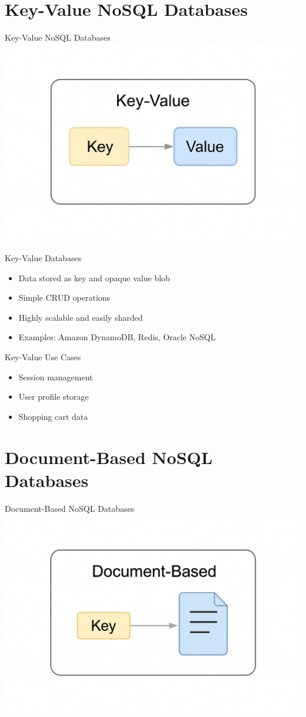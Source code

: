 \documentclass{beamer}
\begin{document}
\section{Key-Value NoSQL Databases}

\begin{frame}{\centering Key-Value NoSQL Databases}
\centering
\includegraphics[width=0.6\linewidth]{figures/key_value_diagram}
\end{frame}

\begin{frame}{Key-Value Databases}
\begin{itemize}
    \item Data stored as key and opaque value blob
    \item Simple CRUD operations
    \item Highly scalable and easily sharded
    \item Examples: Amazon DynamoDB, Redis, Oracle NoSQL
\end{itemize}
\end{frame}

\begin{frame}{Key-Value Use Cases}
\begin{itemize}
    \item Session management
    \item User profile storage
    \item Shopping cart data
\end{itemize}
\end{frame}

\section{Document-Based NoSQL Databases}

\begin{frame}{\centering Document-Based NoSQL Databases}
\centering
\includegraphics[width=0.6\linewidth]{figures/document_db_diagram}
\end{frame}
\end{document}
